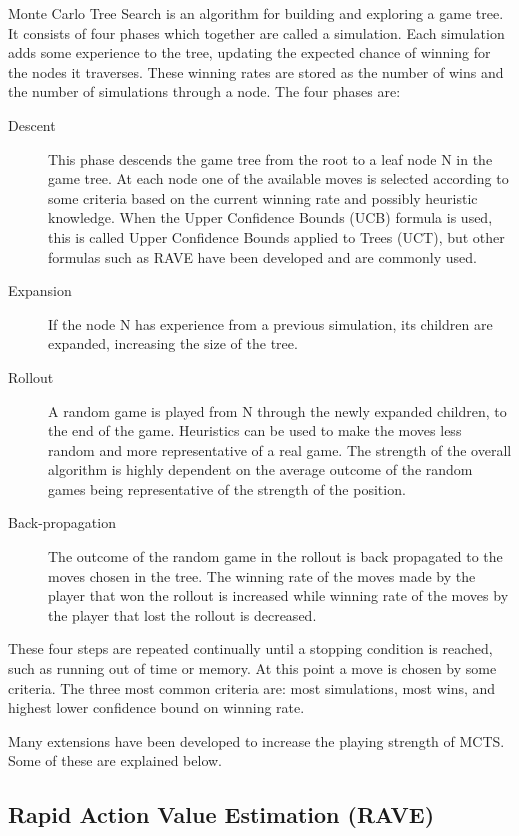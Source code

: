 Monte Carlo Tree Search is an algorithm for building and exploring a game tree. It consists of four phases which together are called a simulation. Each simulation adds some experience to the tree, updating the expected chance of winning for the nodes it traverses. These winning rates are stored as the number of wins and the number of simulations through a node. The four phases are:
\begin{description}
\item[Descent] This phase descends the game tree from the root to a leaf node N in the game tree. At each node one of the available moves is selected according to some criteria based on the current winning rate and possibly heuristic knowledge. When the Upper Confidence Bounds (UCB) formula is used, this is called Upper Confidence Bounds applied to Trees (UCT), but other formulas such as RAVE have been developed and are commonly used.
\item[Expansion] If the node N has experience from a previous simulation, its children are expanded, increasing the size of the tree.
\item[Rollout] A random game is played from N through the newly expanded children, to the end of the game. Heuristics can be used to make the moves less random and more representative of a real game. The strength of the overall algorithm is highly dependent on the average outcome of the random games being representative of the strength of the position.
\item[Back-propagation] The outcome of the random game in the rollout is back propagated to the moves chosen in the tree. The winning rate of the moves made by the player that won the rollout is increased while winning rate of the moves by the player that lost the rollout is decreased.
\end{description}

These four steps are repeated continually until a stopping condition is reached, such as running out of time or memory. At this point a move is chosen by some criteria. The three most common criteria are: most simulations, most wins, and highest lower confidence bound on winning rate.

Many extensions have been developed to increase the playing strength of MCTS. Some of these are explained below.

\subsection{Rapid Action Value Estimation (RAVE)}

